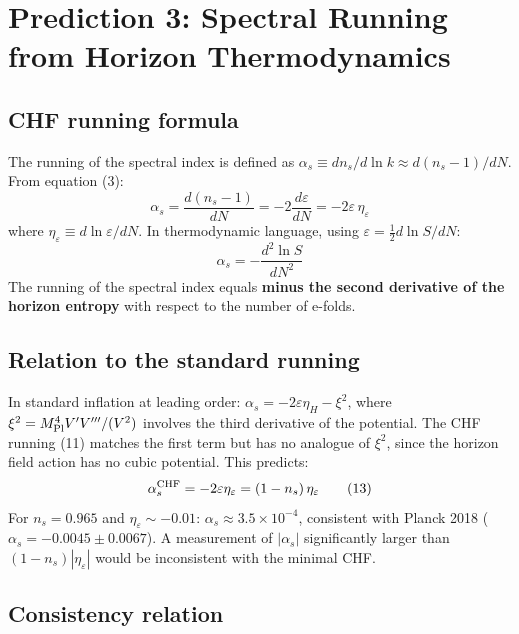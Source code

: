 \documentclass[12pt,a4paper]{article}
\begin{document}
\section{Prediction 3: Spectral Running from Horizon Thermodynamics}

\subsection{CHF running formula}

The running of the spectral index is defined as $\alpha_s \equiv dn_s/d\ln k \approx d(n_s-1)/dN$. From equation (3):
\begin{equation}
\alpha_s = \frac{d(n_s-1)}{dN} = -2\frac{d\varepsilon}{dN} = -2\varepsilon\,\eta_\varepsilon \tag{11}
\end{equation}
where $\eta_\varepsilon \equiv d\ln\varepsilon/dN$. In thermodynamic language, using $\varepsilon = \frac{1}{2}d\ln S/dN$:
\begin{equation}
\alpha_s = -\frac{d^2\ln S}{dN^2} \tag{12}
\end{equation}
The running of the spectral index equals \textbf{minus the second derivative of the horizon entropy} with respect to the number of e-folds.

\subsection{Relation to the standard running}

In standard inflation at leading order: $\alpha_s = -2\varepsilon\eta_H - \xi^2$, where $\xi^2 = M_{\rm Pl}^4 V'V'''/(V^2)$ involves the third derivative of the potential. The CHF running (11) matches the first term but has no analogue of $\xi^2$, since the horizon field action has no cubic potential. This predicts:
\begin{equation}
\alpha_s^{\rm CHF} = -2\varepsilon\eta_\varepsilon = (1-n_s)\,\eta_\varepsilon \tag{13}
\end{equation}
For $n_s = 0.965$ and $\eta_\varepsilon \sim -0.01$: $\alpha_s \approx 3.5\times10^{-4}$, consistent with Planck 2018 ($\alpha_s = -0.0045 \pm 0.0067$). A measurement of $|\alpha_s|$ significantly larger than $(1-n_s)|\eta_\varepsilon|$ would be inconsistent with the minimal CHF.

\subsection{Consistency relation}
\end{document}
